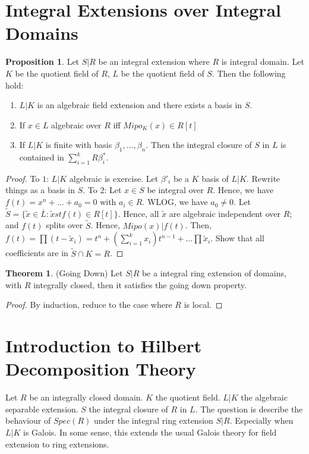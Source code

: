 \documentclass{article}
\theoremstyle{definition}
\newtheorem{theorem}{Theorem}[section]
\theoremstyle{definition}
\theoremstyle{definition}
\newtheorem{proposition}{Proposition}[section]
\theoremstyle{definition}
\theoremstyle{definition}
\theoremstyle{definition}
\theoremstyle{definition}
\begin{document}
\section{Integral Extensions over Integral Domains}

\begin{tcolorbox}[colback=blue!5!white,colframe=blue!30!white]
\begin{proposition}
Let $S|R$ be an integral extension where $R$ is integral domain. Let $K$ be the quotient field of $R$, $L$ be the quotient field of $S$. Then the following hold:
\begin{enumerate}
    \item $L|K$ is an algebraic field extension and there exists a basis in $S$. 
    \item If $x\in L$ algebraic over $R$ iff $Mipo_K(x)\in R[t]$
    \item If $L|K$ is finite with basis $\beta_1,...,\beta_n$. Then the integral closure of $S$ in $L$ is contained in $\sum_{i=1}^{k} R\beta^*_i$. 
\end{enumerate} 
\end{proposition}
\end{tcolorbox}
\begin{proof}
    To $1$: $L|K$ algebraic is exercise.  Let $\beta'_i$ be a $K$ basis of $L|K$. Rewrite things as a basis in $S$. 
    To $2$: Let $x\in S$ be integral over $R$. Hence, we have $f(t)=x^n+...+a_0=0$ with $a_i\in R$. WLOG, we have $a_0\neq 0$. Let $\tilde{S}=\{ \tilde{x}\in \overline{L}: \tilde{x} st f(t)\in R[t] \}$. Hence, all $\tilde{x}$ are algebraic independent over $R$; and $f(t)$ splits over $\tilde{S}$. Hence, $Mipo(x)|f(t)$. Then, $f(t)=\prod (t-\tilde{x}_i)=t^n+(\sum_{i=1}^{k}x_i)t^{n-1}+...\prod \tilde{x}_i$. Show that all coefficients are in $\tilde{S}\cap K=R$. 
\end{proof}


\begin{tcolorbox}[colback=red!5!white,colframe=red!30!white]
\begin{theorem}
(Going Down) Let $S|R$ be a integral ring extension of domains, with $R$ integrally closed, then it satisfies the going down property.
\end{theorem}
\end{tcolorbox}
\begin{proof}
    By induction, reduce to the case where $R$ is local. 
\end{proof}

\section{Introduction to Hilbert Decomposition Theory}
Let $R$ be an integrally closed domain. $K$ the quotient field. $L|K$ the algebraic separable extension. $S$ the integral closure of $R$ in $L$. The question is describe the behaviour of $Spec(R)$ under the integral ring extension $S|R$. Especially when $L|K$ is Galois. In some sense, this extends the usual Galois theory for field extension to ring extensions. 
\end{document}
